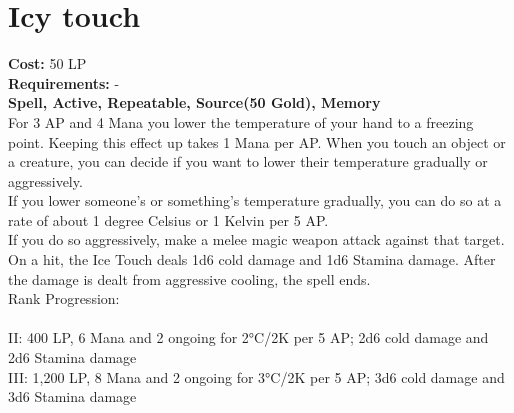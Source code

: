 \section{Icy touch}\label{spell:icyTouch}
\textbf{Cost:} 50 LP\\
\textbf{Requirements:} -\\
\textbf{Spell, Active, Repeatable, Source(50 Gold), Memory}\\
For 3 AP and 4 Mana you lower the temperature of your hand to a freezing point.
Keeping this effect up takes 1 Mana per AP.
When you touch an object or a creature, you can decide if you want to lower their temperature gradually or aggressively.\\
If you lower someone's or something's temperature gradually, you can do so at a rate of about 1 degree Celsius or 1 Kelvin per 5 AP.\\
If you do so aggressively, make a melee magic weapon attack against that target.
On a hit, the Ice Touch deals 1d6 cold damage and 1d6 Stamina damage.
After the damage is dealt from aggressive cooling, the spell ends.
\\
Rank Progression:\\
\\
II: 400 LP, 6 Mana and 2 ongoing for 2°C/2K per 5 AP; 2d6 cold damage and 2d6 Stamina damage\\
III: 1,200 LP, 8 Mana and 2 ongoing for 3°C/2K per 5 AP; 3d6 cold damage and 3d6 Stamina damage\\
